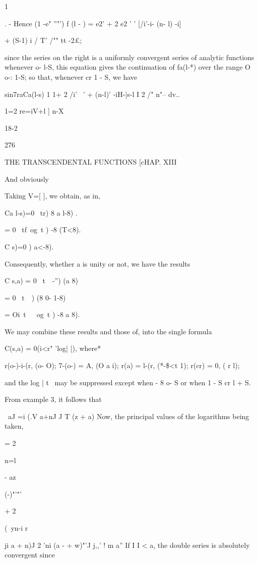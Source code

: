 {{1 %

. - Hence (1 -e" ''"') f (l - ) = e2' + 2 e2 ' ' [/i'-i- (n- l) -i]

+ (S-1) i / T' /"" tt -2£;

since the series on the right is a uniformly convergent series of
analytic functions whenever o- l-S, this equation gives the
continuation of fa(l-*) over the range O o-: 1-S; so that, whenever cr
1 - S, we have

sin7raCa(l-s) 1 1+ 2 /i' ~' + (n-l)' -iH-|s-l I 2 /" n"-- dv..

1=2 re=iV+l ] n-X

18-2

276

THE TRANSCENDENTAL FUNCTIONS [cHAP. XIII

And obviously

Taking V=[ ], we obtain, as in,

Ca l-s)=0 \ tr) 8 a l-8) .

= 0 \ tf\ og\ t ) -8 (T<8).

C s)=0 ) a<-8).

Consequently, whether a is unity or not, we have the results

C s,a) = 0 \ t\ \ -'') (a 8)

= 0 \ t\ \ ) (8 0- 1-8)

= Oi\ t\ \ \ og\ t ) -8 a 8).

We may combine these results and those of, into the single
formula

C(s,a) = 0(i<r" 'log| |), where*

r(o-)-i-(r, (o- O); 7-(o-) = A, (O a i); r(a) = l-(r, (*-\$<t 1);
r(cr) = 0, ( r l);

and the log | t \ may be suppressed except when - 8 o- S or when 1 - S
cr l + S.

From example 3,
it follows that

\ aJ =i (.V a+nJ J T (z + a) Now, the principal values of the
logarithms being taken,

= 2

n=l

- az

  (-)"'"'

+ 2

(\ yn-i r

ji a + n)J 2 'ni (a - + w)"'J j,,' ! m a'' If I I < a, the double
series is absolutely convergent since

}}

